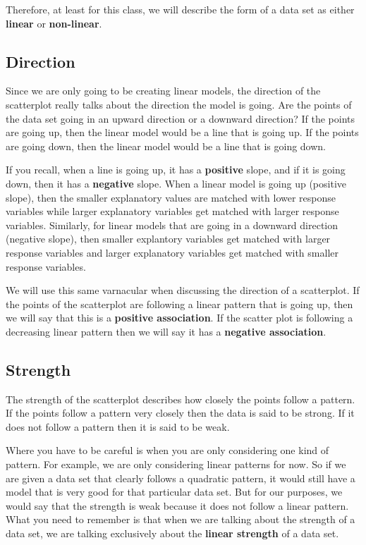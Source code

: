 \documentclass[
  letterpaper,
  DIV=11,
  numbers=noendperiod]{scrreprt}
\begin{document}
Therefore, at least for this class, we will describe the form of a data
set as either \textbf{linear} or \textbf{non-linear}.

\subsection*{Direction}\label{direction}

Since we are only going to be creating linear models, the direction of
the scatterplot really talks about the direction the model is going. Are
the points of the data set going in an upward direction or a downward
direction? If the points are going up, then the linear model would be a
line that is going up. If the points are going down, then the linear
model would be a line that is going down.

If you recall, when a line is going up, it has a \textbf{positive}
slope, and if it is going down, then it has a \textbf{negative} slope.
When a linear model is going up (positive slope), then the smaller
explanatory values are matched with lower response variables while
larger explanatory variables get matched with larger response variables.
Similarly, for linear models that are going in a downward direction
(negative slope), then smaller explantory variables get matched with
larger response variables and larger explanatory variables get matched
with smaller response variables.

We will use this same varnacular when discussing the direction of a
scatterplot. If the points of the scatterplot are following a linear
pattern that is going up, then we will say that this is a
\textbf{positive association}. If the scatter plot is following a
decreasing linear pattern then we will say it has a \textbf{negative
association}.

\subsection*{Strength}\label{strength}

The strength of the scatterplot describes how closely the points follow
a pattern. If the points follow a pattern very closely then the data is
said to be strong. If it does not follow a pattern then it is said to be
weak.

Where you have to be careful is when you are only considering one kind
of pattern. For example, we are only considering linear patterns for
now. So if we are given a data set that clearly follows a quadratic
pattern, it would still have a model that is very good for that
particular data set. But for our purposes, we would say that the
strength is weak because it does not follow a linear pattern. What you
need to remember is that when we are talking about the strength of a
data set, we are talking exclusively about the \textbf{linear strength}
of a data set.
\end{document}
